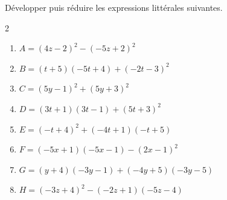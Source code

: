 {%
\begin{Exercice}%
Développer puis réduire les expressions littérales suivantes.
\begin{multicols}{2}
\begin{enumerate}[itemsep=2em,label={}]
	\item \begin{minipage}[t]{\linewidth}$A=(4z-2)^2-(-5z+2)^2$\end{minipage}
	\item \begin{minipage}[t]{\linewidth}$B=(t+5)(-5t+4)+(-2t-3)^2$\end{minipage}
	\item \begin{minipage}[t]{\linewidth}$C=(5y-1)^2+(5y+3)^2$\end{minipage}
	\item \begin{minipage}[t]{\linewidth}$D=(3t+1)(3t-1)+(5t+3)^2$\end{minipage}
	\item \begin{minipage}[t]{\linewidth}$E=(-t+4)^2+(-4t+1)(-t+5)$\end{minipage}
	\item \begin{minipage}[t]{\linewidth}$F=(-5x+1)(-5x-1)-(2x-1)^2$\end{minipage}
	\item \begin{minipage}[t]{\linewidth}$G=(y+4)(-3y-1)+(-4y+5)(-3y-5)$\end{minipage}
	\item \begin{minipage}[t]{\linewidth}$H=(-3z+4)^2-(-2z+1)(-5z-4)$\end{minipage}

\end{enumerate}
\end{multicols}
\end{Exercice}

}
